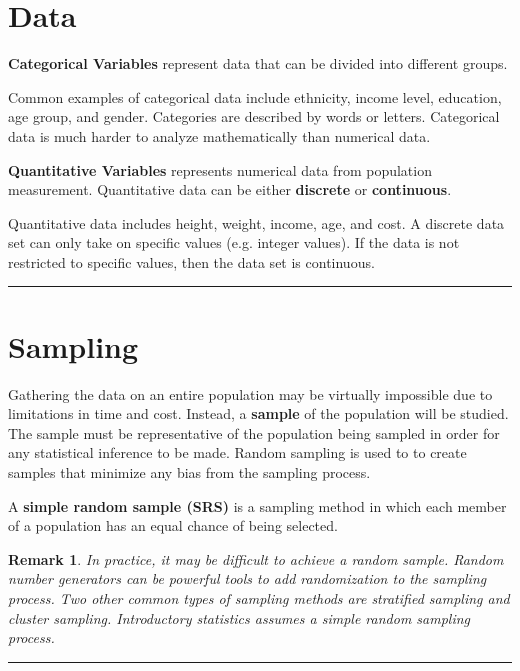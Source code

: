 \documentclass{article}
\newtheorem*{remark}{Remark}
\theoremstyle{definition}
\newcommand{\secend}[0]{\noindent\rule[0.5ex]{\linewidth}{1pt}}
\begin{document}
\section*{Data}
\begin{definition}
    \textbf{Categorical Variables} represent data that can be divided into different
    groups.
\end{definition}

\noindent Common examples of categorical data include ethnicity, income level,
education, age group, and gender. Categories are described by words or letters.
Categorical data is much harder to analyze mathematically than numerical data.
\begin{definition}
    \textbf{Quantitative Variables} represents numerical data from population
    measurement. Quantitative data can be either \textbf{discrete} or
    \textbf{continuous}.
\end{definition}

\noindent Quantitative data includes height, weight, income, age, and
cost. A discrete data set can only take on specific values (e.g. integer
values). If the data is not restricted to specific values, then the data set is 
continuous. 
\secend

\section*{Sampling}
Gathering the data on an entire population may be virtually impossible due to
limitations in time and cost. Instead, a \textbf{sample} of the population will
be studied. The sample must be representative of the population being sampled in
order for any statistical inference to be made. Random sampling is used to to
create samples that minimize any bias from the sampling process. 

\begin{definition}
    A \textbf{simple random sample (SRS)} is a sampling method in which each
    member of a population has an equal chance of being selected.
\end{definition}

\begin{remark}
In practice, it may be difficult to achieve a random sample. Random number 
generators can be powerful tools to add randomization to the sampling process. 
Two other common types of sampling methods are stratified sampling and cluster 
sampling. Introductory statistics assumes a simple random sampling process.
\end{remark}
\secend
\end{document}

